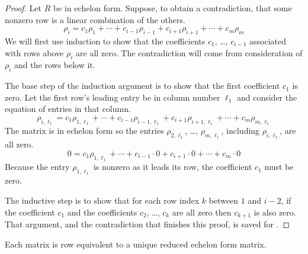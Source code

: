 \begin{proof}
Let $R$ be in echelon form.
Suppose, to obtain a contradiction, that some nonzero row is a linear
combination of the others.
\begin{equation*}
   \rho_i=c_1\rho_1+\cdots+c_{i-1}\rho_{i-1}+
               c_{i+1}\rho_{i+1}+\cdots+c_m\rho_m
\end{equation*}
We will first use induction to show that the coefficients 
$c_1$, \ldots, $c_{i-1}$ associated with rows above $\rho_i$ are all zero.
The contradiction will come from consideration of $\rho_i$ and the rows below
it.

The base step of the induction argument 
is to show that the first coefficient $c_1$ is zero.
Let the first row's leading entry be in column number \( \ell_1 \) 
and consider the equation of entries in that column.
\begin{equation*}
   \rho_{i,\ell_1}=c_1\rho_{1,\ell_1}+\cdots+c_{i-1}\rho_{i-1,\ell_1}
               +c_{i+1}\rho_{i+1,\ell_1}+\cdots+c_m\rho_{m,\ell_1}
\end{equation*}
The matrix is in echelon form so the entries 
$\rho_{2,\ell_1}$, \ldots, $\rho_{m,\ell_1}$, including
$\rho_{i,\ell_1}$, are all zero. 
\begin{equation*}
   0=c_1\rho_{1,\ell_1}+\cdots+c_{i-1}\cdot 0
               +c_{i+1}\cdot 0+\cdots+c_m\cdot 0
\end{equation*}
Because the entry $\rho_{1,\ell_1}$ is nonzero as it leads its row,
the coefficient $c_1$ must be zero.  

The inductive step is to show that 
for each row index $k$ between $1$ and $i-2$,
if the coefficient $c_1$ and the 
coefficients $c_2$, \ldots, $c_{k}$ are all zero 
then $c_{k+1}$ is also zero.
That argument,
and the contradiction that finishes this proof, is saved for 
.
\end{proof}

\begin{theorem}
\label{th:ReducedEchelonFormIsUnique}
Each matrix is row equivalent to a unique reduced echelon form matrix.
\end{theorem}


